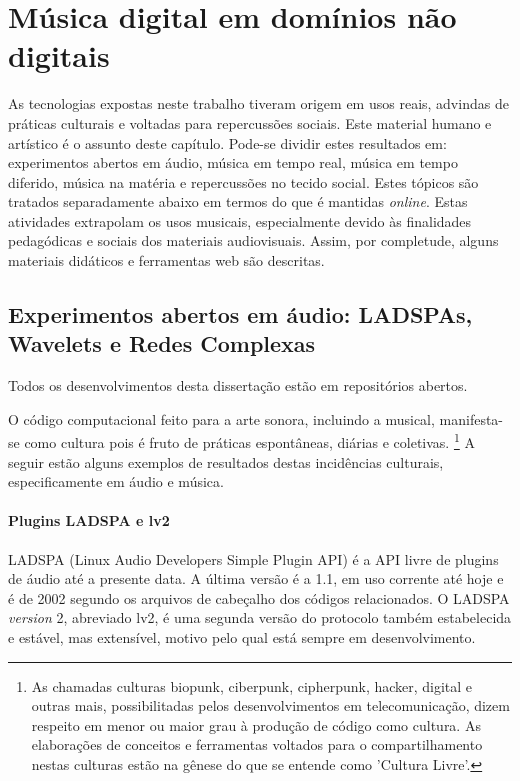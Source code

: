 \chapter{Música digital em domínios não digitais}
\label{cap:musicaExtra}

As tecnologias expostas neste trabalho tiveram origem em
usos reais, advindas
de práticas culturais e voltadas para repercussões sociais.
Este material humano e artístico é o assunto deste
capítulo.
Pode-se dividir estes resultados em:
experimentos abertos em áudio,
música em tempo real,
música em tempo diferido,
música na matéria e
repercussões no tecido social.
Estes tópicos são tratados separadamente
abaixo em termos do que é
mantidas \emph{online}.
Estas atividades extrapolam os usos musicais, especialmente devido às
finalidades pedagódicas e sociais dos materiais audiovisuais.
Assim, por completude, alguns materiais didáticos
e ferramentas web são descritas.

\section{Experimentos abertos em áudio: LADSPAs, Wavelets e Redes Complexas}

Todos os desenvolvimentos desta dissertação estão em repositórios
abertos.\cite{repoDissertacao}

O código computacional feito para a arte sonora, incluindo a musical,
 manifesta-se como cultura pois é fruto de práticas
espontâneas, diárias e coletivas.
\footnote{As chamadas culturas biopunk, ciberpunk, cipherpunk, hacker,
  digital e outras mais, possibilitadas pelos desenvolvimentos
  em telecomunicação, dizem respeito em menor ou maior grau à produção
  de código como cultura. As elaborações de conceitos e ferramentas
  voltados para o compartilhamento nestas culturas estão na gênese do que
  se entende como 'Cultura Livre'.}
A seguir estão alguns exemplos de resultados
destas incidências culturais,
especificamente em áudio
 e música.

\subsubsection{Plugins LADSPA e lv2}

LADSPA (Linux Audio Developers Simple Plugin API) é a API
livre de plugins de áudio até a presente data. A
última versão é a 1.1, em uso corrente até hoje e é
de 2002 segundo os arquivos de cabeçalho dos códigos relacionados.
O LADSPA \emph{version} 2, abreviado lv2, é uma segunda versão do
protocolo também estabelecida e estável, mas extensível, motivo pelo
qual está sempre em desenvolvimento.

